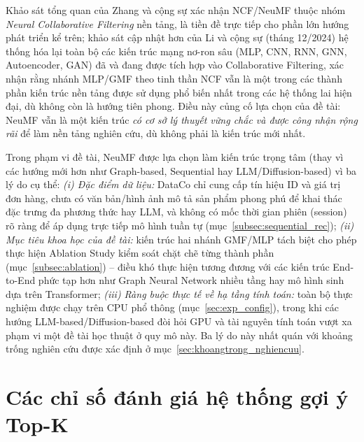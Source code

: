 Khảo sát tổng quan của Zhang và cộng sự \parencite{zhang2019deeplearningsurvey} xác nhận NCF/NeuMF thuộc nhóm \emph{Neural Collaborative Filtering} nền tảng, là tiền đề trực tiếp cho phần lớn hướng phát triển kể trên; khảo sát cập nhật hơn của Li và cộng sự \parencite{li2024dnncf} (tháng 12/2024) hệ thống hóa lại toàn bộ các kiến trúc mạng nơ-ron sâu (MLP, CNN, RNN, GNN, Autoencoder, GAN) đã và đang được tích hợp vào Collaborative Filtering, xác nhận rằng nhánh MLP/GMF theo tinh thần NCF vẫn là một trong các thành phần kiến trúc nền tảng được sử dụng phổ biến nhất trong các hệ thống lai hiện đại, dù không còn là hướng tiên phong. Điều này củng cố lựa chọn của đề tài: NeuMF vẫn là một kiến trúc \emph{có cơ sở lý thuyết vững chắc và được công nhận rộng rãi} để làm nền tảng nghiên cứu, dù không phải là kiến trúc mới nhất.

Trong phạm vi đề tài, NeuMF được lựa chọn làm kiến trúc trọng tâm (thay vì các hướng mới hơn như Graph-based, Sequential hay LLM/Diffusion-based) vì ba lý do cụ thể: \textit{(i) Đặc điểm dữ liệu:} DataCo chỉ cung cấp tín hiệu ID và giá trị đơn hàng, chưa có văn bản/hình ảnh mô tả sản phẩm phong phú để khai thác đặc trưng đa phương thức hay LLM, và không có mốc thời gian phiên (session) rõ ràng để áp dụng trực tiếp mô hình tuần tự (mục~\ref{subsec:sequential_rec}); \textit{(ii) Mục tiêu khoa học của đề tài:} kiến trúc hai nhánh GMF/MLP tách biệt cho phép thực hiện Ablation Study kiểm soát chặt chẽ từng thành phần (mục~\ref{subsec:ablation}) -- điều khó thực hiện tương đương với các kiến trúc End-to-End phức tạp hơn như Graph Neural Network nhiều tầng hay mô hình sinh dựa trên Transformer; \textit{(iii) Ràng buộc thực tế về hạ tầng tính toán:} toàn bộ thực nghiệm được chạy trên CPU phổ thông (mục~\ref{sec:exp_config}), trong khi các hướng LLM-based/Diffusion-based đòi hỏi GPU và tài nguyên tính toán vượt xa phạm vi một đề tài học thuật ở quy mô này. Ba lý do này nhất quán với khoảng trống nghiên cứu được xác định ở mục~\ref{sec:khoangtrong_nghiencuu}.

\section{Các chỉ số đánh giá hệ thống gợi ý Top-K}
\label{sec:metrics}

